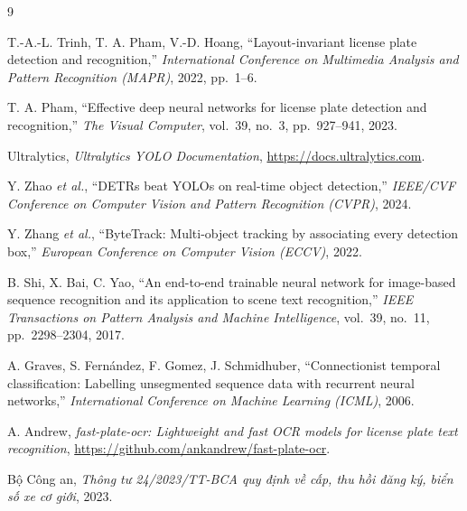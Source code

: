 \clearpage
{}
{}
\begin{thebibliography}{9}

T.-A.-L. Trinh, T. A. Pham, V.-D. Hoang,
``Layout-invariant license plate detection and recognition,''
\textit{International Conference on Multimedia Analysis and Pattern Recognition (MAPR)}, 2022, pp.~1--6.

T. A. Pham,
``Effective deep neural networks for license plate detection and recognition,''
\textit{The Visual Computer}, vol.~39, no.~3, pp.~927--941, 2023.

Ultralytics, \textit{Ultralytics YOLO Documentation}, \url{https://docs.ultralytics.com}.

Y. Zhao \textit{et al.},
``DETRs beat YOLOs on real-time object detection,''
\textit{IEEE/CVF Conference on Computer Vision and Pattern Recognition (CVPR)}, 2024.

Y. Zhang \textit{et al.},
``ByteTrack: Multi-object tracking by associating every detection box,''
\textit{European Conference on Computer Vision (ECCV)}, 2022.

B. Shi, X. Bai, C. Yao,
``An end-to-end trainable neural network for image-based sequence recognition and its application to scene text recognition,''
\textit{IEEE Transactions on Pattern Analysis and Machine Intelligence}, vol.~39, no.~11, pp.~2298--2304, 2017.

A. Graves, S. Fernández, F. Gomez, J. Schmidhuber,
``Connectionist temporal classification: Labelling unsegmented sequence data with recurrent neural networks,''
\textit{International Conference on Machine Learning (ICML)}, 2006.

A. Andrew, \textit{fast-plate-ocr: Lightweight and fast OCR models for license plate text recognition}, \url{https://github.com/ankandrew/fast-plate-ocr}.

Bộ Công an, \textit{Thông tư 24/2023/TT-BCA quy định về cấp, thu hồi đăng ký, biển số xe cơ giới}, 2023.
\end{thebibliography}
